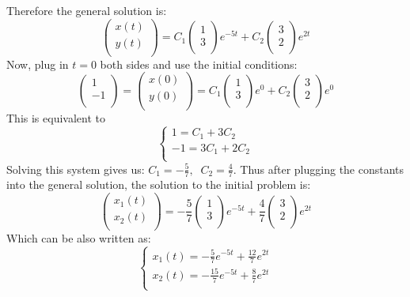 \documentclass[12pt]{report}
\begin{document}
Therefore the general solution is:
$$\begin{pmatrix} x(t) \\ y(t) \\ \end{pmatrix} = C_1 \begin{pmatrix} 1 \\ 3 \\ \end{pmatrix} e^{-5t} + C_2 \begin{pmatrix} 3 \\ 2 \\ \end{pmatrix} e^{2t} $$
Now, plug in $t=0$ both sides and use the initial conditions:
$$ \begin{pmatrix} 1 \\ -1 \\ \end{pmatrix}=\begin{pmatrix} x(0) \\ y(0) \\ \end{pmatrix} = C_1 \begin{pmatrix} 1 \\ 3 \\ \end{pmatrix} e^{0} + C_2 \begin{pmatrix} 3 \\ 2 \\ \end{pmatrix} e^{0} $$
This is equivalent to
$$\begin{cases} 1 = C_1+3C_2 \\ -1 = 3C_1+ 2C_2 \\  \end{cases}$$
Solving this system gives us:
$C_1 = -\frac{5}{7}, \; \; C_2 = \frac{4}{7}$.
Thus after plugging the constants into the general solution, the solution to the initial problem is:
$$\begin{pmatrix} x_1(t) \\ x_2(t) \\ \end{pmatrix} =  -\frac{5}{7} \begin{pmatrix} 1 \\ 3 \\ \end{pmatrix} e^{-5t} + \frac{4}{7} \begin{pmatrix} 3 \\ 2 \\ \end{pmatrix} e^{2t} $$
Which can be also written as:
$$\begin{cases} x_1(t) = -\frac{5}{7}  e^{-5t} +\frac{12}{7}e^{2t} \\ x_2(t) = -\frac{15}{7}  e^{-5t} +\frac{8}{7}e^{2t} \\  \end{cases}$$
\end{document}
